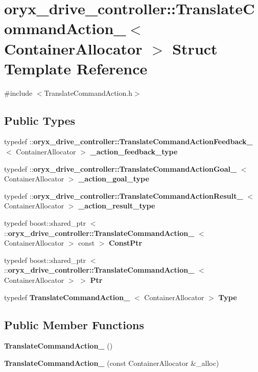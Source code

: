 \section{oryx\-\_\-drive\-\_\-controller\-:\-:\-Translate\-Command\-Action\-\_\-$<$ \-Container\-Allocator $>$ \-Struct \-Template \-Reference}
\label{structoryx__drive__controller_1_1TranslateCommandAction__}


{\ttfamily \#include $<$\-Translate\-Command\-Action.\-h$>$}

\subsection*{\-Public \-Types}
\begin{DoxyCompactItemize}
\item 
typedef \*
\-::{\bf oryx\-\_\-drive\-\_\-controller\-::\-Translate\-Command\-Action\-Feedback\-\_\-}\*
$<$ \-Container\-Allocator $>$ {\bf \-\_\-action\-\_\-feedback\-\_\-type}
\item 
typedef \*
\-::{\bf oryx\-\_\-drive\-\_\-controller\-::\-Translate\-Command\-Action\-Goal\-\_\-}\*
$<$ \-Container\-Allocator $>$ {\bf \-\_\-action\-\_\-goal\-\_\-type}
\item 
typedef \*
\-::{\bf oryx\-\_\-drive\-\_\-controller\-::\-Translate\-Command\-Action\-Result\-\_\-}\*
$<$ \-Container\-Allocator $>$ {\bf \-\_\-action\-\_\-result\-\_\-type}
\item 
typedef boost\-::shared\-\_\-ptr\*
$<$ \-::{\bf oryx\-\_\-drive\-\_\-controller\-::\-Translate\-Command\-Action\-\_\-}\*
$<$ \-Container\-Allocator $>$ const  $>$ {\bf \-Const\-Ptr}
\item 
typedef boost\-::shared\-\_\-ptr\*
$<$ \-::{\bf oryx\-\_\-drive\-\_\-controller\-::\-Translate\-Command\-Action\-\_\-}\*
$<$ \-Container\-Allocator $>$ $>$ {\bf \-Ptr}
\item 
typedef \*
{\bf \-Translate\-Command\-Action\-\_\-}\*
$<$ \-Container\-Allocator $>$ {\bf \-Type}
\end{DoxyCompactItemize}
\subsection*{\-Public \-Member \-Functions}
\begin{DoxyCompactItemize}
\item 
{\bf \-Translate\-Command\-Action\-\_\-} ()
\item 
{\bf \-Translate\-Command\-Action\-\_\-} (const \-Container\-Allocator \&\-\_\-alloc)
\end{DoxyCompactItemize}

